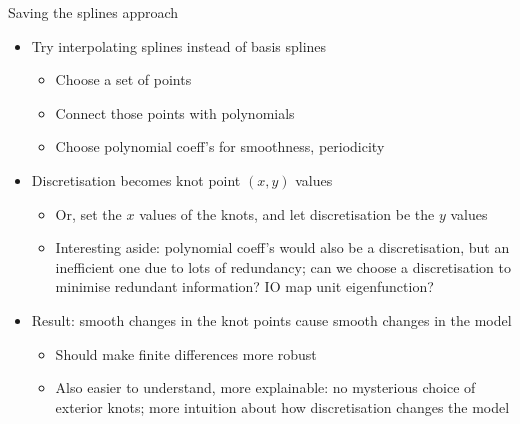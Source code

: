 \documentclass[presentation]{beamer}
\begin{document}
\begin{frame}[<+->][label={sec:org6084438}]{Saving the splines approach}
\begin{itemize}
\item Try interpolating splines instead of basis splines
\begin{itemize}
\item Choose a set of points
\item Connect those points with polynomials
\item Choose polynomial coeff's for smoothness, periodicity
\end{itemize}
\end{itemize}
\vfill
\begin{itemize}
\item Discretisation becomes knot point \((x,y)\) values
\begin{itemize}
\item Or, set the \(x\) values of the knots, and let discretisation be the \(y\) values
\item Interesting aside: polynomial coeff's would also be a discretisation, but an inefficient one due to lots of redundancy; can we choose a discretisation to minimise redundant information? IO map unit eigenfunction?
\end{itemize}
\end{itemize}
\vfill
\begin{itemize}
\item Result: smooth changes in the knot points cause smooth changes in the model
\begin{itemize}
\item Should make finite differences more robust
\item Also easier to understand, more explainable: no mysterious choice of exterior knots; more intuition about how discretisation changes the model
\end{itemize}
\end{itemize}
\end{frame}
\end{document}
